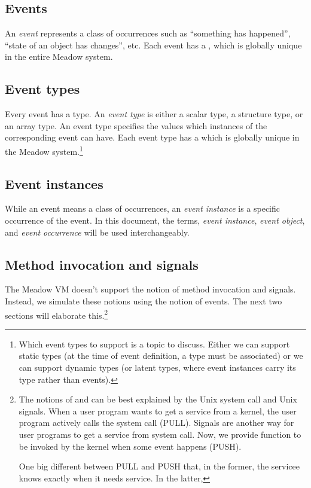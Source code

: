 \documentclass{pamsbook}
\begin{document}
\subsection{Events}
An {\em event} represents a class of occurrences such as ``something has
happened'', ``state of an object has changes'', etc. 
Each event has a , which is globally unique in the entire Meadow
system. 


\subsection{Event types}
Every event has a type. An {\em event type} is either a scalar type, 
a structure type, or an array type.
An event type specifies the
values which instances of the corresponding event can have. 
Each event type has a  which is globally unique in the Meadow
system.\footnote{Which event types to support is a
  topic to discuss. Either we can support static types (at the time of event
  definition, a type must be associated) or we can support dynamic types (or
  latent types, where event instances carry its type rather than events).}

\subsection{Event instances}
While an event means a class of occurrences, an {\em event instance}
is a specific occurrence of the event. In this document, the terms, {\em event
instance\/}, {\em event object\/}, and {\em event occurrence\/} will be used
interchangeably. 

\subsection{Method invocation and signals}
The Meadow VM doesn't support the notion of method invocation and
signals. Instead, we simulate these notions using the notion of events. The
next two sections will elaborate this.\footnote{The notions of  and  can be best explained by the Unix system call and
  Unix signals. When a user program wants to get a service from a
  kernel, the user program actively calls the system call (PULL). Signals
  are another way for user programs to get a service from system call. Now, we
  provide function to be invoked by the kernel when some event happens
  (PUSH). 

  One big different between PULL and PUSH that, in the former, the servicee
  knows exactly when it needs service. In the latter, 
}
\end{document}

